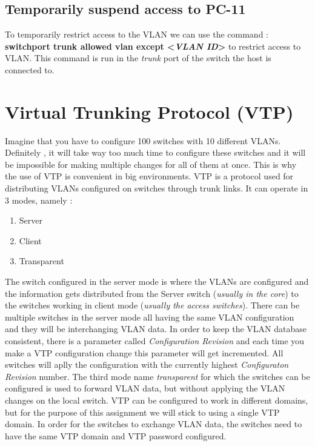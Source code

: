 \documentclass{article}
\begin{document}
\subsection{Temporarily suspend access to PC-11}

To temporarily restrict access to the VLAN we can use the command :\\ \textbf{switchport trunk allowed vlan except \textless\textit{VLAN ID}\textgreater} to restrict access to VLAN. This command is run in the \textit{trunk} port of the switch the host is connected to.

\section{Virtual Trunking Protocol (VTP)}

Imagine that you have to configure 100 switches with
10 different VLANs. Definitely , it will take way too much time
to configure these switches and it will be impossible for 
making multiple changes for all of them at once. This is why the use of VTP is convenient 
in big environments. VTP is a protocol used for distributing VLANs configured on 
switches through trunk links. It can operate in 3 modes, namely :
\begin{enumerate}
    \item  Server             
    \item Client
    \item Transparent
\end{enumerate}

The switch configured in the server mode is where the VLANs are configured and the information gets distributed from the Server switch (\textit{usually in the core}) to the switches working in client mode (\textit{usually the access switches}). There can be multiple switches in the server mode all having the same VLAN configuration and they will be interchanging VLAN data. In order to keep the VLAN database consistent, there is a parameter called \textit{Configuration Revision} and each time you make a VTP configuration change this parameter will get incremented. All switches will aplly the configuration with the currently highest \textit{Configuraton Revision} number. The third mode name \textit{transparent} for which the switches can be configured is used to forward VLAN data, but without applying the VLAN changes on the local switch. VTP can be configured to work in different domains, but for the purpose of this assignment we will stick to using a single VTP domain. In order for the switches to exchange VLAN data, the switches need to have the same VTP domain and VTP password configured.
\end{document}
